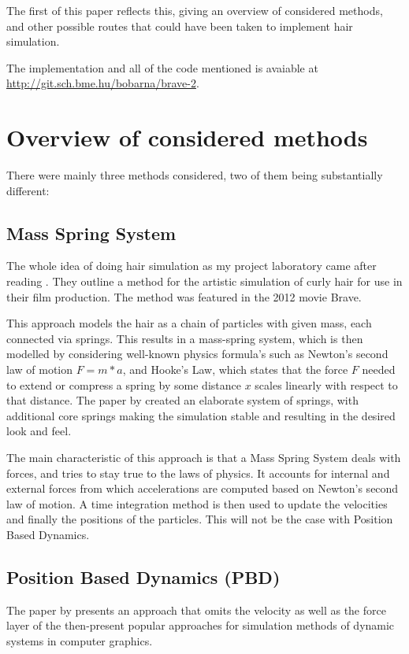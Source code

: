 \documentclass[sigplan,screen,nonacm]{acmart}
\begin{document}
The first of this paper reflects this, giving an overview of considered methods,
and other possible routes that could have been taken to implement hair
simulation.


The implementation and all of the code mentioned is avaiable at
\url{http://git.sch.bme.hu/bobarna/brave-2}.

\section{Overview of considered methods}

There were mainly three methods considered, two of them being substantially
different:


\subsection{Mass Spring System}
The whole idea of doing hair simulation as my project laboratory came after
reading \citet{PixarPaper}. They outline a method for the artistic simulation of
curly hair for use in their film production. The method was featured in the 2012
movie Brave.

This approach models the hair as a chain of particles with given mass, each
connected via springs. This results in a mass-spring system, which is then
modelled by considering well-known physics formula's such as Newton's second law
of motion $F=m*a$, and Hooke's Law, which states that the force $F$
needed to extend or compress a spring by some distance $x$ scales linearly with
respect to that distance. The paper by \citet{PixarPaper} created an elaborate
system of springs, with additional core springs making the simulation stable
and resulting in the desired look and feel.

The main characteristic of this approach is that a Mass Spring System deals with
forces, and tries to stay true to the laws of physics. It accounts for internal 
and external forces from which accelerations are computed based on Newton's 
second law of motion. A time integration method is then used to update the
velocities and finally the positions of the particles. This will not be the case
with Position Based Dynamics.
\subsection{Position Based Dynamics (PBD)}

The paper by \citet{MullerPBD} presents an approach that omits the velocity as
well as the force layer of the then-present popular approaches for simulation
methods of dynamic systems in computer graphics.
\end{document}
